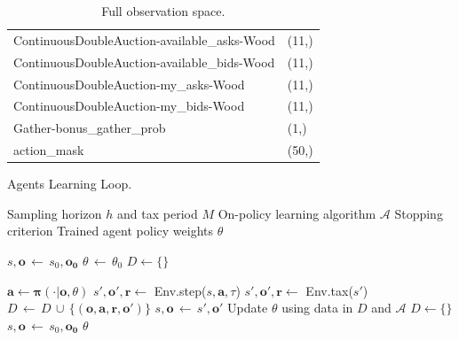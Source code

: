 \begin{table}[]
\begin{tabular}{ll}
    ContinuousDoubleAuction-available\_asks-Wood  & (11,)                                    \\ 
    ContinuousDoubleAuction-available\_bids-Wood  & (11,)                                    \\ 
    ContinuousDoubleAuction-my\_asks-Wood         & (11,)                                \\ 
    ContinuousDoubleAuction-my\_bids-Wood         & (11,)                                    \\ 
    Gather-bonus\_gather\_prob                    & (1,)                                     \\ 
    action\_mask                                  & (50,)                                    \\ \hline
    \end{tabular}
    \caption{\label{tab:full_obs} Full observation space.}
\end{table}




\begin{algorithm}
  \caption{Agents Learning Loop.}\label{alg:training}
  \begin{algorithmic}
    \Require Sampling horizon $h$ and tax period $M$
    \Require On-policy learning algorithm $\mathcal{A}$ 
    \Require Stopping criterion 
    \Ensure Trained agent policy weights $\theta$
    
        \State $s, \mathbf{o} \, \gets \, s_0, \mathbf{o_0}$ 
        \State $\theta \, \gets \, \theta_0$
        \State $D \gets \{\}$ 
        
                \State $\mathbf{a} \gets \mathbf{\pi}(\cdot|\mathbf{o}, \theta)$
                \State $s', \mathbf{o}', \mathbf{r} \gets$ Env.step($s, \mathbf{a}, \tau$)
                    \State $s', \mathbf{o}', \mathbf{r} \gets$ Env.tax($s'$)
                \EndIf
                \State $D\, \gets \, D \, \cup\, \{ (\mathbf{o},\mathbf{a},\mathbf{r},\mathbf{o}')\}$
                \State $s, \mathbf{o} \, \gets \, s', \mathbf{o}'$
            \EndFor
            \State Update $\theta$ using data in $D$ and $\mathcal{A}$
            \State $D \gets \{\}$
                $s, \mathbf{o} \, \gets \, s_0, \mathbf{o_0}$ 
            \EndIf
                \Return $\theta$
            \EndIf
        \EndWhile
  \end{algorithmic}
\end{algorithm}




